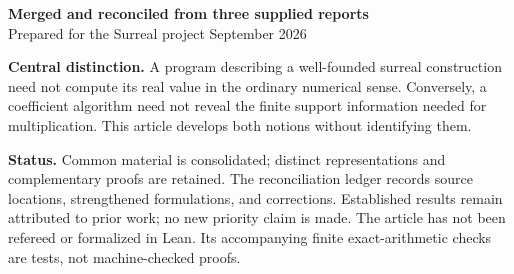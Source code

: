 \documentclass[11pt,letterpaper]{article}
\numberwithin{equation}{section}
\theoremstyle{definition}
\theoremstyle{remark}
\begin{document}
\hypersetup{pageanchor=false}%
\begin{titlepage}
\vspace*{0.8in}
\vspace{0.35in}

\vspace{0.25in}

\vspace{0.35in}

\vspace{0.45in}

\noindent\textbf{Merged and reconciled from three supplied reports}\\
Prepared for the Surreal project \;\textbullet{} September 2026

\vfill
\noindent\begin{minipage}{\textwidth}
\textbf{Central distinction.}
A program describing a well-founded surreal construction need not compute
its real value in the ordinary numerical sense. Conversely, a coefficient
algorithm need not reveal the finite support information needed for multiplication.
This article develops both notions without identifying them.

\medskip
\textbf{Status.} Common material is consolidated; distinct representations and
complementary proofs are retained. The reconciliation ledger records source
locations, strengthened formulations, and corrections. Established results
remain attributed to prior work; no new priority claim is made.
The article has not been refereed or formalized in Lean. Its accompanying
finite exact-arithmetic checks are tests, not machine-checked proofs.
\end{minipage}
\end{titlepage}
\hypersetup{pageanchor=true}%
\end{document}
